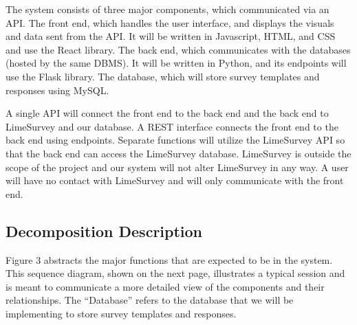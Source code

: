 \documentclass{article}
\begin{document}
The system consists of three major components, which communicated via an API. The front end, which handles the user interface, and displays the visuals and data sent from the API. It will be written in Javascript, HTML, and CSS and use the React library. The back end, which communicates with the databases (hosted by the same DBMS). It will be written in Python, and its endpoints will use the Flask library.  The database, which will store survey templates and responses using MySQL.

A single API will connect the front end to the back end and the back end to LimeSurvey and our database. A REST interface connects the front end to the back end using endpoints. Separate functions will utilize the LimeSurvey API so that the back end can access the LimeSurvey database.  LimeSurvey is outside the scope of the project and our system will not alter LimeSurvey in any way.  A user will have no contact with LimeSurvey and will only communicate with the front end. 

\subsection{Decomposition Description}

Figure 3 abstracts the major functions that are expected to be in the system. This sequence diagram, shown on the next page, illustrates a typical session and is meant to communicate a more detailed view of the components and their relationships. The ``Database'' refers to the database that we will be implementing to store survey templates and responses.

\newpage
\end{document}
